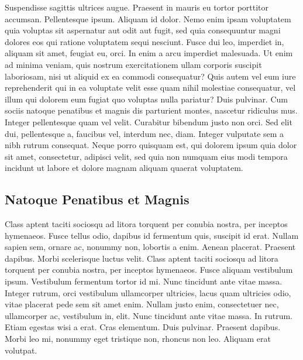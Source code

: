 \documentclass[english,master,dept460,male,cpp,cpdeclaration]{diploma}
\begin{document}
Suspendisse sagittis ultrices augue. Praesent in mauris eu tortor porttitor accumsan. Pellentesque ipsum. Aliquam id dolor. Nemo enim ipsam voluptatem quia voluptas sit aspernatur aut odit aut fugit, sed quia consequuntur magni dolores eos qui ratione voluptatem sequi nesciunt. Fusce dui leo, imperdiet in, aliquam sit amet, feugiat eu, orci. In enim a arcu imperdiet malesuada. Ut enim ad minima veniam, quis nostrum exercitationem ullam corporis suscipit laboriosam, nisi ut aliquid ex ea commodi consequatur? Quis autem vel eum iure reprehenderit qui in ea voluptate velit esse quam nihil molestiae consequatur, vel illum qui dolorem eum fugiat quo voluptas nulla pariatur? Duis pulvinar. Cum sociis natoque penatibus et magnis dis parturient montes, nascetur ridiculus mus. Integer pellentesque quam vel velit. Curabitur bibendum justo non orci. Sed elit dui, pellentesque a, faucibus vel, interdum nec, diam. Integer vulputate sem a nibh rutrum consequat. Neque porro quisquam est, qui dolorem ipsum quia dolor sit amet, consectetur, adipisci velit, sed quia non numquam eius modi tempora incidunt ut labore et dolore magnam aliquam quaerat voluptatem.

\subsection{Natoque Penatibus et Magnis}
Class aptent taciti sociosqu ad litora torquent per conubia nostra, per inceptos hymenaeos. Fusce tellus odio, dapibus id fermentum quis, suscipit id erat. Nullam sapien sem, ornare ac, nonummy non, lobortis a enim. Aenean placerat. Praesent dapibus. Morbi scelerisque luctus velit. Class aptent taciti sociosqu ad litora torquent per conubia nostra, per inceptos hymenaeos. Fusce aliquam vestibulum ipsum. Vestibulum fermentum tortor id mi. Nunc tincidunt ante vitae massa. Integer rutrum, orci vestibulum ullamcorper ultricies, lacus quam ultricies odio, vitae placerat pede sem sit amet enim. Nullam justo enim, consectetuer nec, ullamcorper ac, vestibulum in, elit. Nunc tincidunt ante vitae massa. In rutrum. Etiam egestas wisi a erat. Cras elementum. Duis pulvinar. Praesent dapibus. Morbi leo mi, nonummy eget tristique non, rhoncus non leo. Aliquam erat volutpat.
\end{document}
